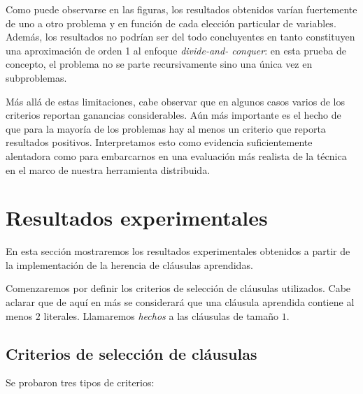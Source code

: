 Como puede observarse en las figuras, los resultados obtenidos varían
fuertemente de uno a otro problema y en función de cada elección particular de
variables. Además, los resultados no podrían ser del todo concluyentes en
tanto constituyen una aproximación de orden 1 al enfoque \emph{divide-and-
conquer}: en esta prueba de concepto, el problema no se parte recursivamente
sino una única vez en subproblemas.

Más allá de estas limitaciones, cabe observar que en algunos casos varios de
los criterios reportan ganancias considerables. Aún más importante es el hecho
de que para la mayoría de los problemas hay al menos un criterio que reporta
resultados positivos. Interpretamos esto como evidencia suficientemente
alentadora como para embarcarnos en una evaluación más realista de la técnica
en el marco de nuestra herramienta distribuida.

\section{Resultados experimentales}

En esta sección mostraremos los resultados experimentales obtenidos a partir
de la implementación de la herencia de cláusulas aprendidas.

Comenzaremos por definir los criterios de selección de cláusulas utilizados.
Cabe aclarar que de aquí en más se considerará que una cláusula aprendida
contiene al menos $2$ literales. Llamaremos \emph{hechos} a las cláusulas de
tamaño $1$.

\subsection{Criterios de selección de cláusulas}

Se probaron tres tipos de criterios:

